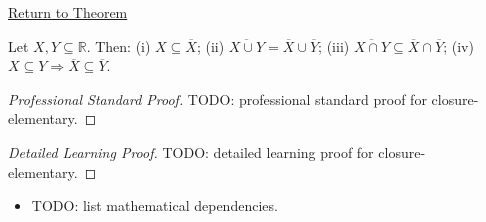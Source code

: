 \newpage
{}
\label{prf:closure-elementary}

\begin{remark*}[Return]
\hyperref[lem:closure-elementary]{Return to Theorem}
\end{remark*}

\begin{theorem*}
Let $X, Y \subseteq \mathbb{R}$. Then: (i) $X \subseteq \overline{X}$;
(ii) $\overline{X \cup Y} = \overline{X} \cup \overline{Y}$;
(iii) $\overline{X \cap Y} \subseteq \overline{X} \cap \overline{Y}$;
(iv) $X \subseteq Y \Rightarrow \overline{X} \subseteq \overline{Y}$.

\smallskip\noindent
\end{theorem*}

\begin{proof}[Professional Standard Proof]
\LRAProofBodyStart
TODO: professional standard proof for closure-elementary.
\end{proof}

\begin{proof}[Detailed Learning Proof]
\LRAProofBodyStart
TODO: detailed learning proof for closure-elementary.
\end{proof}

\begin{remark*}
\end{remark*}

\begin{dependencies}
\begin{itemize}
  \item TODO: list mathematical dependencies.
\end{itemize}
\end{dependencies}

\clearpage
